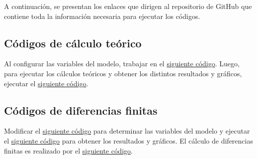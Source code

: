 A continuación, se presentan los enlaces que dirigen al repositorio de GitHub que contiene toda la información necesaria para ejecutar los códigos.

\subsection{Códigos de cálculo teórico}

Al configurar las variables del modelo, trabajar en el \href{https://github.com/LukasWolff2002/ENTREGA_3_MCOC/blob/main/CODIGO/CALCULOS_MANUALES/variables.py}{siguiente código}. Luego, para ejecutar los cálculos teóricos y obtener los distintos resultados y gráficos, ejecutar el \href{https://github.com/LukasWolff2002/ENTREGA_3_MCOC/blob/main/CODIGO/CALCULOS_MANUALES/main.py}{siguiente código}.

\subsection{Códigos de diferencias finitas}

Modificar el \href{https://github.com/LukasWolff2002/ENTREGA_3_MCOC/blob/main/CODIGO/LAPLACE/variables.py}{siguiente código} para determinar las variables del modelo y ejecutar el \href{https://github.com/LukasWolff2002/ENTREGA_3_MCOC/blob/main/CODIGO/LAPLACE/main.py}{siguiente código} para obtener los resultados y gráficos. El cálculo de diferencias finitas es realizado por el \href{https://github.com/LukasWolff2002/ENTREGA_3_MCOC/blob/main/CODIGO/LAPLACE/laplace_solver.py}{siguiente código}. 
